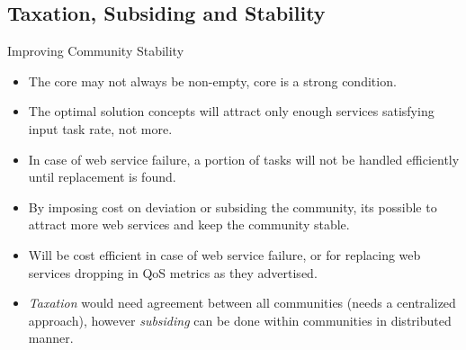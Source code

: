 \documentclass{beamer}
\begin{document}
\subsection{Taxation, Subsiding and Stability}
\begin{frame}{Improving Community Stability}
    \footnotesize
    \begin{itemize}
        \item The core may not always be non-empty, core is a strong condition.
        \item The optimal solution concepts will attract only enough services satisfying input task rate, not more.
        \item In case of web service failure, a portion of tasks will not be handled efficiently until replacement is found.
        \item By imposing cost on deviation or subsiding the community, its possible to attract more web services and keep the community stable.
        \item Will be cost efficient in case of web service failure, or for replacing web services dropping in QoS metrics as they advertised.
        \item \emph{Taxation} would need agreement between all communities (needs a centralized approach), however \emph{subsiding} can be done within communities in distributed manner.
    \end{itemize}
\end{frame}
\end{document}
